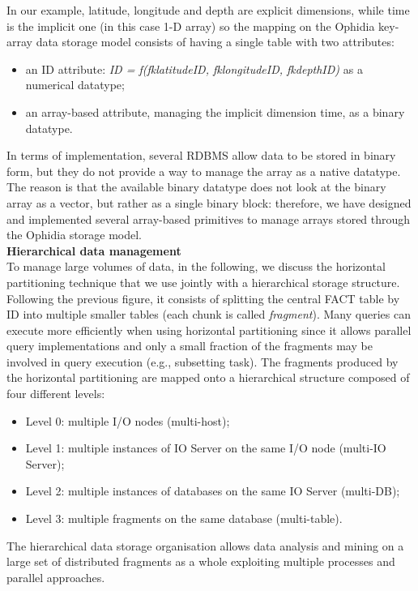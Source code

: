 In our example, latitude, longitude and depth are explicit dimensions, while time is the implicit one (in this case 1-D array) so the mapping on the Ophidia key-array data storage model consists of having a single table with two attributes:
\begin{itemize}
	\item an ID attribute: \textit{ID = f(fk\textunderscore latitudeID, fk\textunderscore longitudeID, fk\textunderscore depthID)} as a numerical datatype;
	\item an array-based attribute, managing the implicit dimension time, as a binary datatype.
\end{itemize}
In terms of implementation, several RDBMS allow data to be stored in binary form, but they do not provide a way to manage the array as a native datatype. The reason is that the available binary datatype does not look at the binary array as a vector, but rather as a single binary block: therefore, we have designed and implemented several array-based primitives to manage arrays stored through the Ophidia storage model.\\

\textbf{Hierarchical data management}\\

To manage large volumes of data, in the following, we discuss the horizontal partitioning technique that we use jointly with a hierarchical storage structure. Following the previous figure, it consists of splitting the central FACT table by ID into multiple smaller tables (each chunk is called \textit{fragment}). Many queries can execute more efficiently when using horizontal partitioning since it allows parallel query implementations and only a small fraction of the fragments may be involved in query execution (e.g., subsetting task). The fragments produced by the horizontal partitioning are mapped onto a hierarchical structure composed of four different levels:
\begin{itemize}
	\item Level 0: multiple I/O nodes (multi-host);
	\item Level 1: multiple instances of IO Server on the same I/O node (multi-IO Server);
	\item Level 2: multiple instances of databases on the same IO Server (multi-DB);
	\item Level 3: multiple fragments on the same database (multi-table).
\end{itemize}
The hierarchical data storage organisation allows data analysis and mining on a large set of distributed fragments as a whole exploiting multiple processes and parallel approaches.

